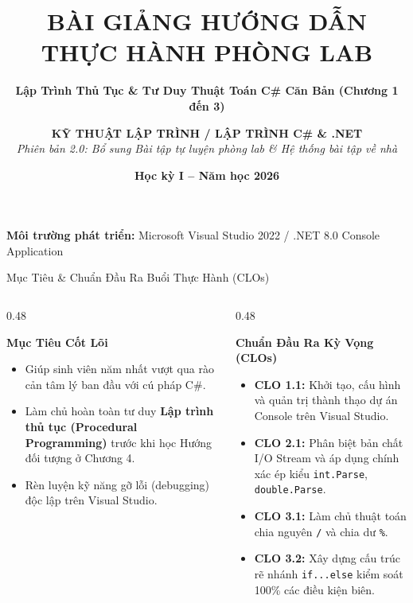 \documentclass[aspectratio=169, 10pt]{beamer}
\title[\textbf{Thực hành C\# (Chương 1 - 3)}]{\textbf{\LARGE BÀI GIẢNG HƯỚNG DẪN THỰC HÀNH PHÒNG LAB}}
\subtitle{\textbf{\large Lập Trình Thủ Tục \& Tư Duy Thuật Toán C\# Căn Bản (Chương 1 đến 3)}}
\author[\textbf{Khoa CNTT -- IT26M}]{\textbf{KỸ THUẬT LẬP TRÌNH / LẬP TRÌNH C\# \& .NET}\\\textit{Phiên bản 2.0: Bổ sung Bài tập tự luyện phòng lab \& Hệ thống bài tập về nhà}}
\institute[\textbf{Lớp IT26M}]{\textbf{Khoa Công nghệ Thông tin -- Đại học Đông Á}\\\textbf{Đối tượng:} Lớp IT26M (Khóa 2026) | \textbf{Thời lượng:} 180 phút trên máy}
\date[\textbf{2026}]{\textbf{Học kỳ I -- Năm học 2026}}
\begin{document}
\begin{frame}[plain]
  \titlepage
  \begin{center}
    \scriptsize\color{UniNavy}\textbf{Môi trường phát triển:} Microsoft Visual Studio 2022 / .NET 8.0 Console Application
  \end{center}
\end{frame}

\begin{frame}{Mục Tiêu \& Chuẩn Đầu Ra Buổi Thực Hành (CLOs)}
  \begin{columns}[T]
    \begin{column}{0.48\textwidth}
      \begin{block}{\textbf{Mục Tiêu Cốt Lõi}}
        \begin{itemize}
          \item Giúp sinh viên năm nhất vượt qua rào cản tâm lý ban đầu với cú pháp C\#.
          \item Làm chủ hoàn toàn tư duy \textbf{Lập trình thủ tục (Procedural Programming)} trước khi học Hướng đối tượng ở Chương 4.
          \item Rèn luyện kỹ năng gỡ lỗi (debugging) độc lập trên Visual Studio.
        \end{itemize}
      \end{block}
    \end{column}
    \begin{column}{0.48\textwidth}
      \begin{exampleblock}{\textbf{Chuẩn Đầu Ra Kỳ Vọng (CLOs)}}
        \begin{itemize}
          \item \textbf{CLO 1.1:} Khởi tạo, cấu hình và quản trị thành thạo dự án Console trên Visual Studio.
          \item \textbf{CLO 2.1:} Phân biệt bản chất I/O Stream và áp dụng chính xác ép kiểu \texttt{int.Parse}, \texttt{double.Parse}.
          \item \textbf{CLO 3.1:} Làm chủ thuật toán chia nguyên \texttt{/} và chia dư \texttt{\%}.
          \item \textbf{CLO 3.2:} Xây dựng cấu trúc rẽ nhánh \texttt{if...else} kiểm soát 100\% các điều kiện biên.
        \end{itemize}
      \end{exampleblock}
    \end{column}
  \end{columns}
\end{frame}
\end{document}

